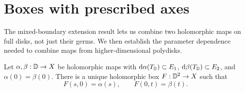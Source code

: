 \section{Boxes with prescribed axes}\label{sec:boxes}

The mixed-boundary extension result lets us combine two holomorphic maps
on full disks, not just their germs. We then establish the parameter
dependence needed to combine maps from higher-dimensional polydisks.

\begin{proposition}\label{prop:disk-axes}
Let \(\alpha,\beta:\mathbb D\to X\) be holomorphic maps with
\(\mathrm d\alpha(T_\mathbb D)\subset E_1\), \(\mathrm d\beta(T_\mathbb D)\subset E_2\), and
\(\alpha(0)=\beta(0)\). There is a unique holomorphic box
\(F:\mathbb D^2\to X\) such that
\[
 F(s,0)=\alpha(s),\qquad F(0,t)=\beta(t).
\]
\end{proposition}

